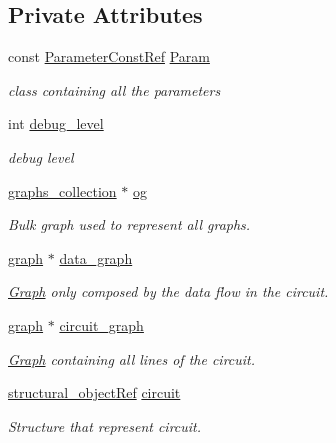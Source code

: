 \subsection*{Private Attributes}
\begin{DoxyCompactItemize}
\item 
const \hyperlink{Parameter_8hpp_a37841774a6fcb479b597fdf8955eb4ea}{Parameter\+Const\+Ref} \hyperlink{classstructural__manager_a4796736ce9b888ff69ba88a37bab2ed1}{Param}
\begin{DoxyCompactList}\small\item\em class containing all the parameters \end{DoxyCompactList}\item 
int \hyperlink{classstructural__manager_a43c8b12b9806d6d14d35b7ce1bc2694e}{debug\+\_\+level}
\begin{DoxyCompactList}\small\item\em debug level \end{DoxyCompactList}\item 
\hyperlink{structgraphs__collection}{graphs\+\_\+collection} $\ast$ \hyperlink{classstructural__manager_a3262e4c848eaa1b32414f80981c524d4}{og}
\begin{DoxyCompactList}\small\item\em Bulk graph used to represent all graphs. \end{DoxyCompactList}\item 
\hyperlink{structgraph}{graph} $\ast$ \hyperlink{classstructural__manager_a252780856f661284bc23989c96ccffd9}{data\+\_\+graph}
\begin{DoxyCompactList}\small\item\em \hyperlink{structGraph}{Graph} only composed by the data flow in the circuit. \end{DoxyCompactList}\item 
\hyperlink{structgraph}{graph} $\ast$ \hyperlink{classstructural__manager_a57a50d52692ac18f10a722707cd88d2b}{circuit\+\_\+graph}
\begin{DoxyCompactList}\small\item\em \hyperlink{structGraph}{Graph} containing all lines of the circuit. \end{DoxyCompactList}\item 
\hyperlink{structural__objects_8hpp_a8ea5f8cc50ab8f4c31e2751074ff60b2}{structural\+\_\+object\+Ref} \hyperlink{classstructural__manager_a1ec86354bfec056cc3bd6fd7aa89b6a9}{circuit}
\begin{DoxyCompactList}\small\item\em Structure that represent circuit. \end{DoxyCompactList}\end{DoxyCompactItemize}
